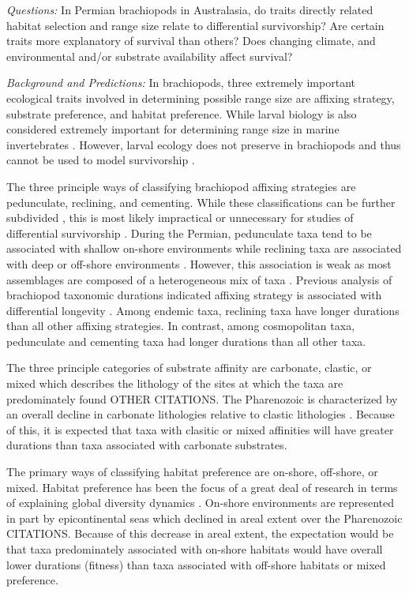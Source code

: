 \documentclass[12pt,letterpaper]{article}
\begin{document}
\textit{Questions:} In Permian brachiopods in Australasia, do traits directly related habitat selection and range size relate to differential survivorship? Are certain traits more explanatory of survival than others? Does changing climate, and environmental and/or substrate availability affect survival?

\textit{Background and Predictions:}
In brachiopods, three extremely important ecological traits involved in determining possible range size are affixing strategy, substrate preference, and habitat preference. While larval biology is also considered extremely important for determining range size in marine invertebrates \citep{Jablonski2006a,Jablonski1983}. However, larval ecology does not preserve in brachiopods and thus cannot be used to model survivorship \citep{Jablonski1983}.

The three principle ways of classifying brachiopod affixing strategies are pedunculate, reclining, and cementing. While these classifications can be further subdivided \citep{Alexander1977}, this is most likely impractical or unnecessary for studies of differential survivorship \citep{Clapham2007}. During the Permian, pedunculate taxa tend to be associated with shallow on-shore environments while reclining taxa are associated with deep or off-shore environments \citep{Clapham2007}. However, this association is weak as most assemblages are composed of a heterogeneous mix of taxa \citep{Clapham2007}. Previous analysis of brachiopod taxonomic durations indicated affixing strategy is associated with differential longevity \citep{Alexander1977}. Among endemic taxa, reclining taxa have longer durations than all other affixing strategies. In contrast, among cosmopolitan taxa, pedunculate and cementing taxa had longer durations than all other taxa. 

The three principle categories of substrate affinity are carbonate, clastic, or mixed which describes the lithology of the sites at which the taxa are predominately found \citep{Foote2006} OTHER CITATIONS. The Pharenozoic is characterized by an overall decline in carbonate lithologies relative to clastic lithologies \citep{Foote2006,Miller2001}. Because of this, it is expected that taxa with clasitic or mixed affinities will have greater durations than taxa associated with carbonate substrates. %

The primary ways of classifying habitat preference are on-shore, off-shore, or mixed. Habitat preference has been the focus of a great deal of research in terms of explaining global diversity dynamics \citep{Sepkoski1991}. On-shore environments are represented in part by epicontinental seas which declined in areal extent over the Pharenozoic CITATIONS. Because of this decrease in areal extent, the expectation would be that taxa predominately associated with on-shore habitats would have overall lower durations (fitness) than taxa associated with off-shore habitats or mixed preference.
\end{document}
